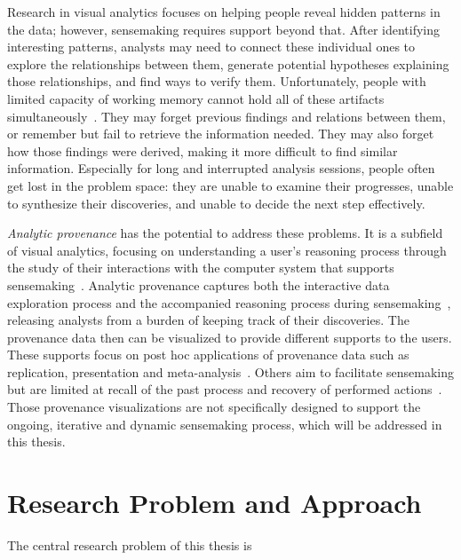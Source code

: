 Research in visual analytics focuses on helping people reveal hidden patterns in the data; however, sensemaking requires support beyond that. After identifying interesting patterns, analysts may need to connect these individual ones to explore the relationships between them, generate potential hypotheses explaining those relationships, and find ways to verify them. Unfortunately, people with limited capacity of working memory cannot hold all of these artifacts simultaneously~\cite{Heuer1999}. They may forget previous findings and relations between them, or remember but fail to retrieve the information needed. They may also forget how those findings were derived, making it more difficult to find similar information. Especially for long and interrupted analysis sessions, people often get lost in the problem space: they are unable to examine their progresses, unable to synthesize their discoveries, and unable to decide the next step effectively.

\emph{Analytic provenance} has the potential to address these problems. It is a subfield of  visual analytics, focusing on understanding a user's reasoning process through the study of their interactions with the computer system that supports sensemaking~\cite{North2011}. Analytic provenance captures both the interactive data exploration process and the accompanied reasoning process during sensemaking~\cite{Xu2015}, releasing analysts from a burden of keeping track of their discoveries. The provenance data then can be visualized to provide different supports to the users. These supports focus on post hoc applications of provenance data such as replication, presentation and meta-analysis~\cite{Ragan2016}. Others aim to facilitate sensemaking but are limited at recall of the past process and recovery of performed actions~\cite{Heer2008}. Those provenance visualizations are not specifically designed to support the ongoing, iterative and dynamic sensemaking process, which will be addressed in this thesis.

\section{Research Problem and Approach}

The central research problem of this thesis is
\begin{center}
\end{center}

